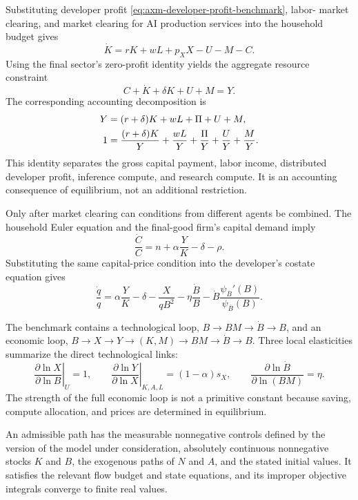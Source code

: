 Substituting developer profit \eqref{eq:axm-developer-profit-benchmark}, labor-
market clearing, and market clearing for AI production services into the
household budget gives
\[
 \dot K=rK+wL+p_XX-U-M-C.
\]
Using the final sector's zero-profit identity yields the aggregate resource
constraint
\begin{equation}
 C+\dot K+\delta K+U+M=Y.
 \label{eq:axm-resource}
\end{equation}
The corresponding accounting decomposition is
\begin{align}
 Y&=(r+\delta)K+wL+\Pi+U+M,\notag\\
 1&=\frac{(r+\delta)K}{Y}+\frac{wL}{Y}
 +\frac{\Pi}{Y}+\frac{U}{Y}+\frac{M}{Y}.
 \label{eq:axm-consolidated-distribution-benchmark}
\end{align}
This identity separates the gross capital payment, labor income, distributed
developer profit, inference compute, and research compute. It is an accounting
consequence of equilibrium, not an additional restriction.

Only after market clearing can conditions from different agents be combined.
The household Euler equation and the final-good firm's capital demand imply
\begin{equation}
 \frac{\dot C}{C}=n+\alpha\frac{Y}{K}-\delta-\rho.
 \label{eq:axm-euler-reduced}
\end{equation}
Substituting the same capital-price condition into the developer's costate
equation gives
\begin{equation}
 \frac{\dot q}{q}=\alpha\frac{Y}{K}-\delta-
 \frac{X}{qB^2}-\eta\frac{\dot B}{B}
 -\dot B\frac{\psi_{\overline B}'(B)}{
 \psi_{\overline B}(B)}.
 \label{eq:axm-costate-reduced-benchmark}
\end{equation}

The benchmark contains a technological loop,
\(B\to BM\to\dot B\to B\), and an economic loop,
\(B\to X\to Y\to(K,M)\to BM\to\dot B\to B\). Three local elasticities
summarize the direct technological links:
\begin{equation}
 \left.\frac{\partial\ln X}{\partial\ln B}\right|_U=1,\qquad
 \left.\frac{\partial\ln Y}{\partial\ln X}\right|_{K,A,L}
 =(1-\alpha)s_X,\qquad
 \frac{\partial\ln\dot B}{\partial\ln(BM)}=\eta.
 \label{eq:axm-local-feedback-links-benchmark}
\end{equation}
The strength of the full economic loop is not a primitive constant because
saving, compute allocation, and prices are determined in equilibrium.

\begin{definition}
An admissible path has the measurable nonnegative controls defined by the
version of the model under consideration, absolutely continuous nonnegative
stocks \(K\) and \(B\), the exogenous paths of \(N\) and \(A\), and the stated
initial values. It satisfies the relevant flow budget and state equations, and
its improper objective integrals converge to finite real values.
\end{definition}

